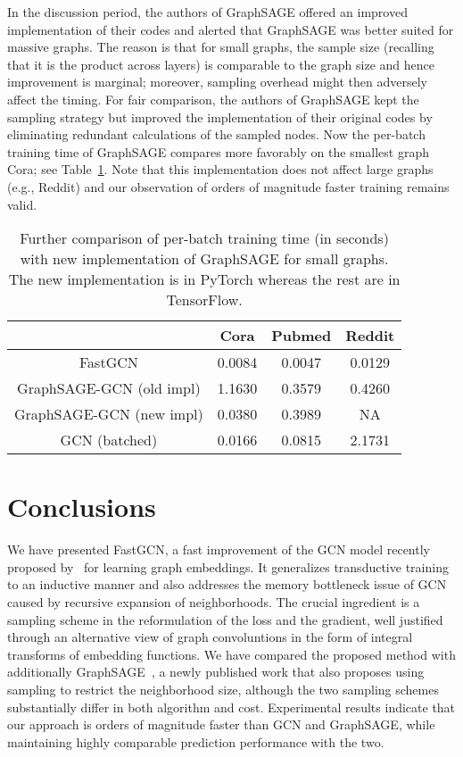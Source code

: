\documentclass{article} \usepackage{iclr2018_conference,times}
\theoremstyle{plain}\newtheorem{theorem}{Theorem}\theoremstyle{plain}\newtheorem{proposition}[theorem]{Proposition}
\theoremstyle{plain}\newtheorem{corollary}[theorem]{Corollary}
\theoremstyle{plain}\newtheorem{lemma}[theorem]{Lemma}
\begin{document}
In the discussion period, the authors of GraphSAGE offered an improved implementation of their codes and alerted that GraphSAGE was better suited for massive graphs. The reason is that for small graphs, the sample size (recalling that it is the product across layers) is comparable to the graph size and hence improvement is marginal; moreover, sampling overhead might then adversely affect the timing. For fair comparison, the authors of GraphSAGE kept the sampling strategy but improved the implementation of their original codes by eliminating redundant calculations of the sampled nodes. Now the per-batch training time of GraphSAGE compares more favorably on the smallest graph Cora; see Table~\ref{tab:GraphSAGE.new}. Note that this implementation does not affect large graphs (e.g., Reddit) and our observation of orders of magnitude faster training remains valid.

\begin{table}[ht]
\centering
\caption{Further comparison of per-batch training time (in seconds) with new implementation of GraphSAGE for small graphs. The new implementation is in PyTorch whereas the rest are in TensorFlow.}
\label{tab:GraphSAGE.new}
\begin{tabular}{cccc}
\hline
& Cora & Pubmed & Reddit\\
\hline
FastGCN                  &0.0084 & 0.0047 & 0.0129\\
GraphSAGE-GCN (old impl) &1.1630 & 0.3579 & 0.4260\\
GraphSAGE-GCN (new impl) &0.0380 & 0.3989 & NA \\
GCN (batched)            &0.0166 & 0.0815 & 2.1731\\
\hline
\end{tabular}
\end{table}


\section{Conclusions}
We have presented FastGCN, a fast improvement of the GCN model recently proposed by~\cite{DBLP:journals/corr/KipfW16} for learning graph embeddings. It generalizes transductive training to an inductive manner and also addresses the memory bottleneck issue of GCN caused by recursive expansion of neighborhoods. The crucial ingredient is a sampling scheme in the reformulation of the loss and the gradient, well justified through an alternative view of graph convoluntions in the form of integral transforms of embedding functions. We have compared the proposed method with additionally GraphSAGE~\citep{DBLP:journals/corr/HamiltonYL17}, a newly published work that also proposes using sampling to restrict the neighborhood size, although the two sampling schemes substantially differ in both algorithm and cost. Experimental results indicate that our approach is orders of magnitude faster than GCN and GraphSAGE, while maintaining highly comparable prediction performance with the two.
\end{document}
